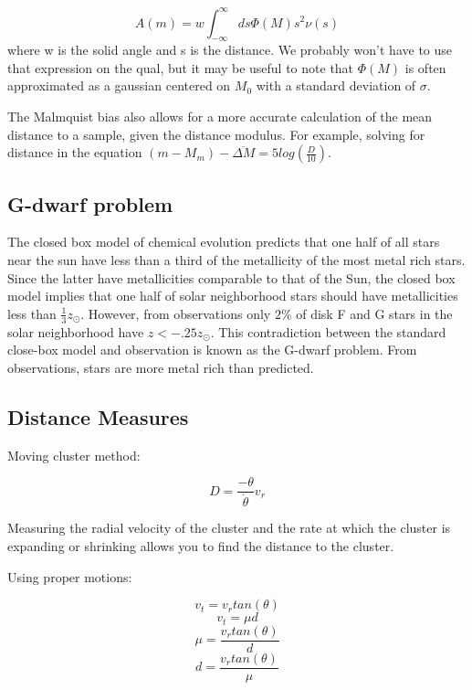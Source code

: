 \begin{equation}
A(m) = w\int^\infty_{-\infty} ds \Phi(M) s^2 \nu(s)
\end{equation}
where w is the solid angle and s is the distance. We probably won't have to use that expression on the qual, but it may be useful to note that $\Phi(M)$ is often approximated as a gaussian centered on $M_0$ with a standard deviation of $\sigma$. 

The Malmquist bias also allows for a more accurate calculation of the mean distance to a sample, given the distance modulus. For example, solving for distance in the equation $(m-M_m)-\overline{\Delta M} = 5log\left(\frac{D}{10} \right)$.

\subsection{G-dwarf problem}

The closed box model of chemical evolution predicts that one half of all stars near the sun have less than a third of the metallicity of the most metal rich stars.  Since the latter have metallicities comparable to that of the Sun, the closed box model implies that one half of solar neighborhood stars should have metallicities less than $\frac{1}{3}z_\odot$.  However, from observations only $2$\% of disk F and G stars in the solar neighborhood have $z < -.25 z_\odot$.  This contradiction between the standard close-box model and observation is known as the G-dwarf problem.  From observations, stars are more metal rich than predicted.

\subsection{Distance Measures}

Moving cluster method:

\begin{equation}
D = \frac{-\theta}{\dot \theta}v_r
\end{equation}

Measuring the radial velocity of the cluster and the rate at which the cluster is expanding or shrinking allows you to find the distance to the cluster.

Using proper motions:

\begin{equation}
v_t = v_rtan(\theta)
\end{equation}
\begin{equation}
v_t = \mu d
\end{equation}
\begin{equation}
\mu = \frac{v_rtan(\theta)}{d}
\end{equation}
\begin{equation}
d = \frac{v_rtan(\theta)}{\mu}
\end{equation}

